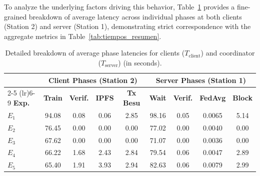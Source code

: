 To analyze the underlying factors driving this behavior, Table~\ref{tab:desglose_fases} provides a fine-grained breakdown of average latency across individual phases at both clients (Station 2) and server (Station 1), demonstrating strict correspondence with the aggregate metrics in Table~\ref{tab:tiempos_resumen}.

\begin{table}[htbp]
\caption{Detailed breakdown of average phase latencies for clients ($T_{\text{client}}$) and coordinator ($T_{\text{server}}$) (in seconds).}\label{tab:desglose_fases}
\begin{tabular*}{\textwidth}{@{\extracolsep\fill}lcccc|cccc}
\toprule
& \multicolumn{4}{c|}{\textbf{Client Phases (Station 2)}} & \multicolumn{4}{c}{\textbf{Server Phases (Station 1)}} \\
\cmidrule(lr){2-5} \cmidrule(lr){6-9}
\textbf{Exp.} & \textbf{Train} & \textbf{Verif.} & \textbf{IPFS} & \textbf{Tx Besu} & \textbf{Wait} & \textbf{Verif.} & \textbf{FedAvg} & \textbf{Block} \\
\midrule
$E_1$ & 94.08 & 0.08 & 0.06 & 2.85 & 98.16 & 0.05 & 0.0065 & 5.14 \\
$E_2$ & 76.45 & 0.00 & 0.00 & 0.00 & 77.02 & 0.00 & 0.0040 & 0.00 \\
\midrule
$E_3$ & 67.62 & 0.00 & 0.00 & 0.00 & 71.07 & 0.00 & 0.0036 & 0.00 \\
$E_4$ & 66.22 & 1.68 & 2.43 & 2.84 & 79.54 & 0.06 & 0.0047 & 2.89 \\
$E_5$ & 65.40 & 1.91 & 3.93 & 2.94 & 82.63 & 0.06 & 0.0079 & 2.99 \\
\bottomrule
\end{tabular*}
\end{table}

